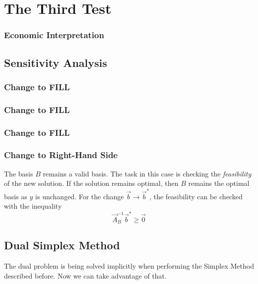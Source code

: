 \chapter{The Third Test}



\subsection{Economic Interpretation}


\section{Sensitivity Analysis}

\subsection{Change to FILL}
\subsection{Change to FILL}
\subsection{Change to FILL}


\subsection{Change to Right-Hand Side}
The basis $B$ remains a valid basis. The task in this case is checking the \textit{feasibility} of the new solution. If the solution remains optimal, then $B$ remains the optimal basis as $y$ is unchanged. For the change $\Vec{b}\rightarrow \Vec{b}^*$, the feasibility can be checked with the inequality
\begin{equation}
    \Vec{A}_B^{-1} \Vec{b}^* \geq \Vec{0}
\end{equation}



\section{Dual Simplex Method}
The dual problem is being solved implicitly when performing the Simplex Method described before. Now we can take advantage of that.


